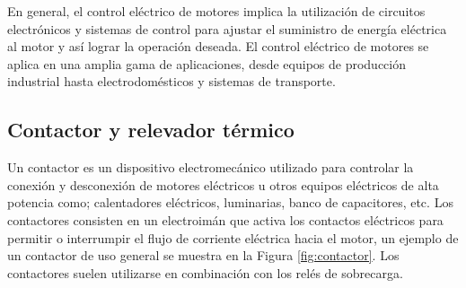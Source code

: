 En general, el control eléctrico de motores implica la utilización de circuitos electrónicos y sistemas de control para ajustar el suministro de energía eléctrica al motor y así lograr la operación deseada. El control eléctrico de motores se aplica en una amplia gama de aplicaciones, desde equipos de producción industrial hasta electrodomésticos y sistemas de transporte.

\subsection{Contactor y relevador térmico}

Un contactor es un dispositivo electromecánico utilizado para controlar la conexión y desconexión de motores eléctricos u otros equipos eléctricos de alta potencia como; calentadores eléctricos, luminarias, banco de capacitores, etc. Los contactores consisten en un electroimán que activa los contactos eléctricos para permitir o interrumpir el flujo de corriente eléctrica hacia el motor, un ejemplo de un contactor de uso general se muestra en la Figura \ref{fig:contactor}. Los contactores suelen utilizarse en combinación con los relés de sobrecarga.


